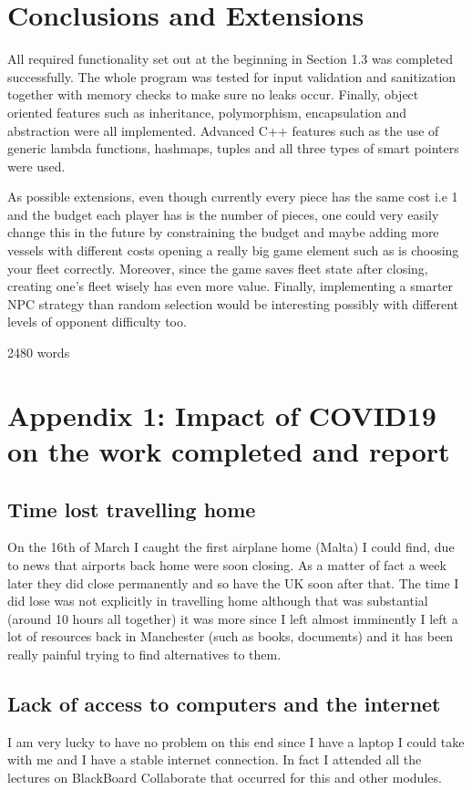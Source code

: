 \documentclass[11pt]{article} %
\begin{document}
\section{Conclusions and Extensions}
All required functionality set out at the beginning in Section 1.3 was completed successfully.
The whole program was tested for input validation and sanitization
together with memory checks to make sure no leaks occur.
Finally, object oriented features such as inheritance, polymorphism,
encapsulation and abstraction were all implemented.
Advanced C++ features such as the use of generic lambda functions, hashmaps,
tuples and all three types of smart pointers were used.
\\
\par As possible extensions, even though currently every piece has the same cost i.e 1 and the budget each player has is the number of pieces,
one could very easily change this in the future by constraining the budget and maybe adding more vessels with different costs
opening a really big game element such as is choosing your fleet correctly.
Moreover, since the game saves fleet state after closing, creating one's fleet wisely has even more value.
Finally, implementing a smarter NPC strategy than random selection would be interesting possibly with
different levels of opponent difficulty too.
\\
\par \hfill 2480 words\\
\printbibliography
\newpage
\section*{Appendix 1: Impact of COVID19 on the work completed and report}
\subsection{Time lost travelling home}
On the 16th of March I caught the first airplane home (Malta) I could find, due to news that airports back home were soon closing.
As a matter of fact a week later they did close permanently and so have the UK soon after that.
The time I did lose was not explicitly in travelling home although that was substantial (around 10 hours all together)
it was more since I left almost imminently I left a lot of resources back in Manchester (such as books, documents) and it has
been really painful trying to find alternatives to them.
\subsection{Lack of access to computers and the internet}
I am very lucky to have no problem on this end since I have a laptop I could take with me and
I have a stable internet connection.
In fact I attended all the lectures on BlackBoard Collaborate that occurred for this and other modules.
\end{document}
